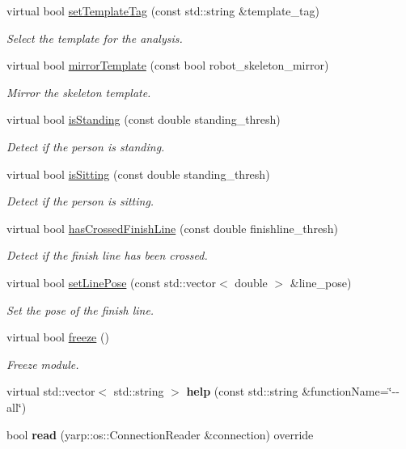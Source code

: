 \begin{DoxyCompactItemize}
virtual bool \mbox{\hyperlink{classmotionAnalyzer__IDL_a60012ac489f03d4bd8fb272c557b0144}{set\+Template\+Tag}} (const std\+::string \&template\+\_\+tag)
\begin{DoxyCompactList}\small\item\em Select the template for the analysis. \end{DoxyCompactList}\item 
virtual bool \mbox{\hyperlink{classmotionAnalyzer__IDL_a7c16a7a17fa15d7bc8ef369f7de0c90f}{mirror\+Template}} (const bool robot\+\_\+skeleton\+\_\+mirror)
\begin{DoxyCompactList}\small\item\em Mirror the skeleton template. \end{DoxyCompactList}\item 
virtual bool \mbox{\hyperlink{classmotionAnalyzer__IDL_a12bec8ae19daddd4b01d06bb5453e303}{is\+Standing}} (const double standing\+\_\+thresh)
\begin{DoxyCompactList}\small\item\em Detect if the person is standing. \end{DoxyCompactList}\item 
virtual bool \mbox{\hyperlink{classmotionAnalyzer__IDL_afbc001ddbf3f499d2ade5681cf0c7f54}{is\+Sitting}} (const double standing\+\_\+thresh)
\begin{DoxyCompactList}\small\item\em Detect if the person is sitting. \end{DoxyCompactList}\item 
virtual bool \mbox{\hyperlink{classmotionAnalyzer__IDL_a1799aa66881c880c666cd580a5615b33}{has\+Crossed\+Finish\+Line}} (const double finishline\+\_\+thresh)
\begin{DoxyCompactList}\small\item\em Detect if the finish line has been crossed. \end{DoxyCompactList}\item 
virtual bool \mbox{\hyperlink{classmotionAnalyzer__IDL_a9169bb6dd0ca068bd040bab9d93724ed}{set\+Line\+Pose}} (const std\+::vector$<$ double $>$ \&line\+\_\+pose)
\begin{DoxyCompactList}\small\item\em Set the pose of the finish line. \end{DoxyCompactList}\item 
virtual bool \mbox{\hyperlink{classmotionAnalyzer__IDL_a5eb19773188b6a025e74a3ba35bc623d}{freeze}} ()
\begin{DoxyCompactList}\small\item\em Freeze module. \end{DoxyCompactList}\item 
\mbox{\label{classmotionAnalyzer__IDL_a11954460905060e7f9d7ec2a287cee72}} 
virtual std\+::vector$<$ std\+::string $>$ {\bfseries help} (const std\+::string \&function\+Name=\char`\"{}-\/-\/all\char`\"{})
\item 
\mbox{\label{classmotionAnalyzer__IDL_a155c67538af54a6f3ec82381b921a159}} 
bool {\bfseries read} (yarp\+::os\+::\+Connection\+Reader \&connection) override
\end{DoxyCompactItemize}


